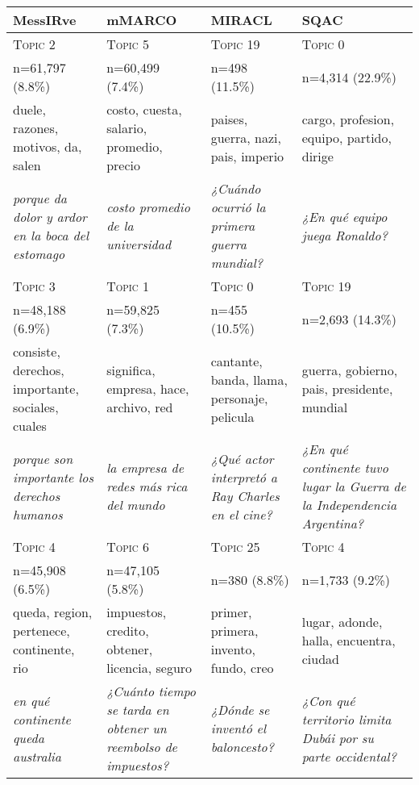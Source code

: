 \begin{tabular}{|>{\centering\arraybackslash}m{3.5cm}|>{\centering\arraybackslash}m{3.5cm}|>{\centering\arraybackslash}m{3.5cm}|>{\centering\arraybackslash}m{3.5cm}|}
    \hline
    \textbf{MessIRve}        & \textbf{mMARCO}          & \textbf{MIRACL}          & \textbf{SQAC}          \\ \hline

    \textsc{Topic 2} & \textsc{Topic 5} & \textsc{Topic 19} & \textsc{Topic 0} \\
    n=61,797 (8.8\%) & n=60,499 (7.4\%) & n=498 (11.5\%) & n=4,314 (22.9\%) \\
    duele, razones, motivos, da, salen & costo, cuesta, salario, promedio, precio & paises, guerra, nazi, pais, imperio & cargo, profesion, equipo, partido, dirige \\
    \textit{porque da dolor y ardor en la boca del estomago} & \textit{costo promedio de la universidad} & \textit{¿Cuándo ocurrió la primera guerra mundial?} & \textit{¿En qué equipo juega Ronaldo?} \\
    \hline
    \textsc{Topic 3} & \textsc{Topic 1} & \textsc{Topic 0} & \textsc{Topic 19} \\
    n=48,188 (6.9\%) & n=59,825 (7.3\%) & n=455 (10.5\%) & n=2,693 (14.3\%) \\
    consiste, derechos, importante, sociales, cuales & significa, empresa, hace, archivo, red & cantante, banda, llama, personaje, pelicula & guerra, gobierno, pais, presidente, mundial \\
    \textit{porque son importante los derechos humanos} & \textit{la empresa de redes más rica del mundo} & \textit{¿Qué actor interpretó a Ray Charles en el cine?} & \textit{¿En qué continente tuvo lugar la Guerra de la Independencia Argentina?} \\
    \hline
    \textsc{Topic 4} & \textsc{Topic 6} & \textsc{Topic 25} & \textsc{Topic 4} \\
    n=45,908 (6.5\%) & n=47,105 (5.8\%) & n=380 (8.8\%) & n=1,733 (9.2\%) \\
    queda, region, pertenece, continente, rio & impuestos, credito, obtener, licencia, seguro & primer, primera, invento, fundo, creo & lugar, adonde, halla, encuentra, ciudad \\
    \textit{en qué continente queda australia} & \textit{¿Cuánto tiempo se tarda en obtener un reembolso de impuestos?} & \textit{¿Dónde se inventó el baloncesto?} & \textit{¿Con qué territorio limita Dubái por su parte occidental?} \\

\end{tabular}
